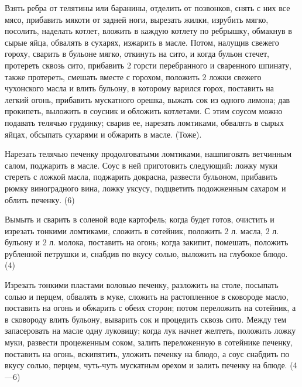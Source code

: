 
Взять ребра от телятины или баранины, отделить от позвонков, снять с них все мясо, прибавить мякоти от задней ноги, вырезать жилки, изрубить мягко, посолить, наделать котлет, вложить в каждую котлету по ребрышку, обмакнув в сырые яйца, обвалять в сухарях, изжарить в масле. Потом, налущив свежего гороху, сварить в бульоне мягко, откинуть на сито, и когда бульон стечет, протереть сквозь сито, прибавить 2 горсти перебранного и сваренного шпинату, также протереть, смешать вместе с горохом, положить 2 ложки свежего чухонского масла и влить бульону, в которому варился горох, поставить на легкий огонь, прибавить мускатного орешка, выжать сок из одного лимона; дав прокипеть, выложить в соусник и обложить котлетами. С этим соусом можно подавать телячью грудинку; сварив ее, нарезать ломтиками, обвалять в сырых яйцах, обсыпать сухарями и обжарить в масле. (Тоже). 


Нарезать телячью печенку продолговатыми ломтиками, нашпиговать ветчинным салом, поджарить в масле. Соус в ней приготовить следующий: ложку муки стереть с ложкой масла, поджарить докрасна, развести бульоном, прибавить рюмку виноградного вина, ложку уксусу, подцветить подожженным сахаром и облить печенку. (6) 


Вымыть и сварить в соленой воде картофель; когда будет готов, очистить и изрезать тонкими ломтиками, сложить в сотейник, положить 2 л. масла, 2 л. бульону и 2 л. молока, поставить на огонь; когда закипит, помешать, положить рубленной петрушки и, снабдив по вкусу солью, выложить на глубокое блюдо. (4) 


Изрезать тонкими пластами воловью печенку, разложить на столе, посыпать солью и перцем, обвалять в муке, сложить на растопленное в сковороде масло, поставить на огонь и обжарить с обеих сторон; потом переложить на сотейник, а в сковороду влить бульону, выварить сок и процедить сквозь сито. Между тем запасеровать на масле одну луковицу; когда лук начнет желтеть, положить ложку муки, развести процеженным соком, залить переложенную в сотейнике печенку, поставить на огонь, вскипятить, уложить печенку на блюдо, а соус снабдить по вкусу солью, перцем, чуть-чуть мускатным орехом и залить печенку на блюде. (4—6) 

